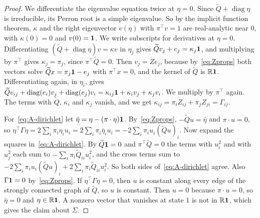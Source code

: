 \begin{proof}
We differentiate the eigenvalue equation twice at $\eta=0$. Since
$\widetilde Q+\operatorname{diag}\eta$ is irreducible, its Perron root is a simple
eigenvalue. So by the implicit function theorem, $\kappa$ and the right
eigenvector $v(\eta)$ with $\pi^\top v=1$ are real-analytic near $0$, with
$\kappa(0)=0$ and $v(0)=\mathbf{1}$. We write subscripts for derivatives at
$\eta=0$. Differentiating $(\widetilde Q+\operatorname{diag}\eta)v=\kappa v$ in $\eta_j$
gives $\widetilde Qv_j+e_j=\kappa_j\mathbf{1}$, and multiplying by $\pi^\top$ gives
$\kappa_j=\pi_j$, since $\pi^\top \widetilde Q=0$. Then $v_j=Ze_j$, because
by~\eqref{eq:Zprops} both vectors solve $\widetilde Qx=\pi_j\mathbf{1}-e_j$ with
$\pi^\top x=0$, and the kernel of $\widetilde Q$ is $\mathbb{R}\mathbf{1}$. Differentiating again, in
$\eta_i$, gives
$\widetilde Qv_{ij}+\operatorname{diag}(e_i)v_j+\operatorname{diag}(e_j)v_i
=\kappa_{ij}\mathbf{1}+\kappa_iv_j+\kappa_jv_i$. We multiply by $\pi^\top$ again.
The terms with $\widetilde Q$, $\kappa_i$ and $\kappa_j$ vanish, and we get
$\kappa_{ij}=\pi_iZ_{ij}+\pi_jZ_{ji}=\Gamma_{ij}$.

For~\eqref{eq:A-dirichlet} let $\bar\eta=\eta-(\pi\cdot\eta)\mathbf{1}$.
By~\eqref{eq:Zprops}, $-\widetilde Qu=\bar\eta$ and $\pi\cdot u=0$, so
$\eta^\top\Gamma\eta=2\sum_i\pi_i\eta_iu_i=2\sum_i\pi_i\bar\eta_iu_i
=-2\sum_i\pi_iu_i(\widetilde Qu)_i$. Now expand the squares in~\eqref{eq:A-dirichlet}.
By $\widetilde Q\mathbf{1}=0$ and $\pi^\top \widetilde Q=0$ the terms with $u_i^2$ and with $u_j^2$ each
sum to $-\sum_i\pi_i\widetilde Q_{ii}u_i^2$, and the cross terms sum to
$-2\sum_i\pi_iu_i(\widetilde Qu)_i+2\sum_i\pi_i\widetilde Q_{ii}u_i^2$. So both sides
of~\eqref{eq:A-dirichlet} agree. Also $\Gamma\mathbf{1}=0$ by~\eqref{eq:Zprops}.
If $\eta^\top\Gamma\eta=0$, then $u$ is constant along every edge of the
strongly connected graph of $\widetilde Q$, so $u$ is constant. Then $u=0$ because
$\pi\cdot u=0$, so $\bar\eta=0$ and $\eta\in\mathbb{R}\mathbf{1}$. A nonzero vector that vanishes
at state $1$ is not in $\mathbb{R}\mathbf{1}$, which gives the claim about $\Sigma$.
\end{proof}

